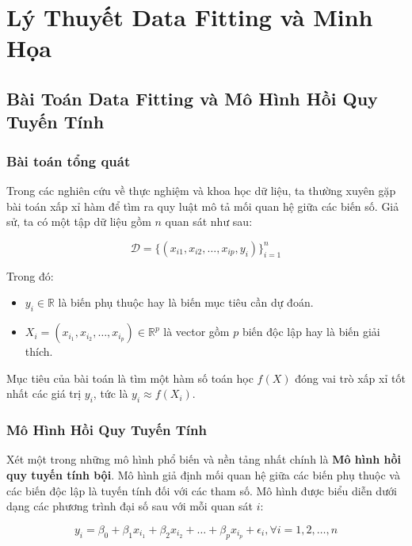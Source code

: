 \chapter{Lý Thuyết Data Fitting và Minh Họa}

\newpage

\section{Bài Toán Data Fitting và Mô Hình Hồi Quy Tuyến Tính}

\subsection{Bài toán tổng quát}

Trong các nghiên cứu về thực nghiệm và khoa học dữ liệu, ta thường xuyên gặp bài toán xấp xỉ hàm để tìm ra quy luật mô tả mối quan hệ giữa các biến số. Giả sử, ta có một tập dữ liệu gồm $n$ quan sát như sau:

\begin{equation}
    \mathcal{D} = \{(x_{i1}, x_{i2}, \dots, x_{ip}, y_i)\}_{i=1}^n
\end{equation}

Trong đó:

\begin{itemize}[topsep=0pt, itemsep=2.5pt, leftmargin=1.5cm]
    \item $y_i \in \mathbb{R}$ là biến phụ thuộc hay là biến mục tiêu cần dự đoán.
    \item $X_i = (x_{i_1}, x_{i_2}, \dots, x_{i_p}) \in \mathbb{R}^p$ là vector gồm $p$ biến độc lập hay là biến giải thích.
\end{itemize}

Mục tiêu của bài toán là tìm một hàm số toán học $f(X)$ đóng vai trò xấp xỉ tốt nhất các giá trị $y_i$, tức là $y_i \approx f(X_i)$.

\subsection{Mô Hình Hồi Quy Tuyến Tính}

Xét một trong những mô hình phổ biến và nền tảng nhất chính là \textbf{Mô hình hồi quy tuyến tính bội}. Mô hình giả định mối quan hệ giữa các biến phụ thuộc và các biến độc lập là tuyến tính đối với các tham số. Mô hình được biểu diễn dưới dạng các phương trình đại số sau với mỗi quan sát $i$:

\begin{equation}
    y_i = \beta_0 + \beta_1 x_{i_1} + \beta_2 x_{i_2} + \dots + \beta_p x_{i_p} + \epsilon_i, \forall i = 1, 2, \dots, n
\end{equation}

